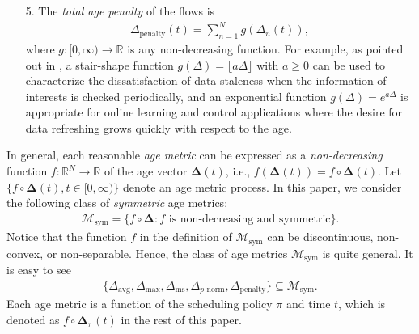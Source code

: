 {\begin{itemize}

\item[5.] The \emph{total age penalty} of the flows is
\begin{align}%
\Delta_{\text{penalty}} (t) = \sum_{n=1}^N g(\Delta_{n} (t)),\nonumber
\end{align}
where $g: [0,\infty) \rightarrow \mathbb{R}$ is any non-decreasing function. For example, as pointed out in \cite{report_AgeOfInfo2016}, a stair-shape function $g(\Delta)=\lfloor a \Delta\rfloor$ with $a\geq 0$ can be used to characterize the dissatisfaction of data staleness when the information of interests is checked periodically, and an exponential function $g(\Delta) = e^{a \Delta}$ is appropriate for online learning and control applications where the desire for data refreshing grows quickly with respect to the age.
\end{itemize}

In general, each reasonable \emph{age metric} can be expressed as a \emph{non-decreasing} function $f: \mathbb{R}^N\rightarrow \mathbb{R}$ of the age vector  $\bm{\Delta}(t)$, i.e., $f (\bm{\Delta} (t)) = f \circ\bm{\Delta} (t)$. Let $\{f \circ\bm{\Delta}(t), t\in[0,\infty)\}$ denote  an age metric process. 
In this paper, we consider the following class of \emph{symmetric} age metrics:
\begin{align}%
\mathcal{M}_{\text{sym}}\!=\!\{f \circ\bm{\Delta} : f \text{ is non-decreasing and symmetric}\}.\nonumber
\end{align}
Notice that  the function $f$ in the definition of $\mathcal{M}_{\text{sym}}$ can be discontinuous, non-convex, or non-separable. Hence, the class  of age metrics $\mathcal{M}_{\text{sym}}$ is quite general.
It is easy to see 
\begin{align}
\{\Delta_{\text{avg}},\Delta_{\max}, \Delta_{\text{ms}},\Delta_{\text{$p$-norm}}, %
\Delta_{\text{penalty}}\}\subseteq \mathcal{M}_{\text{sym}}.\nonumber
\end{align}
Each age metric is a function of the scheduling policy $\pi$ and time $t$, which is denoted as  $f \circ\bm{\Delta}_\pi(t)$ in the rest of this paper.
%

}
